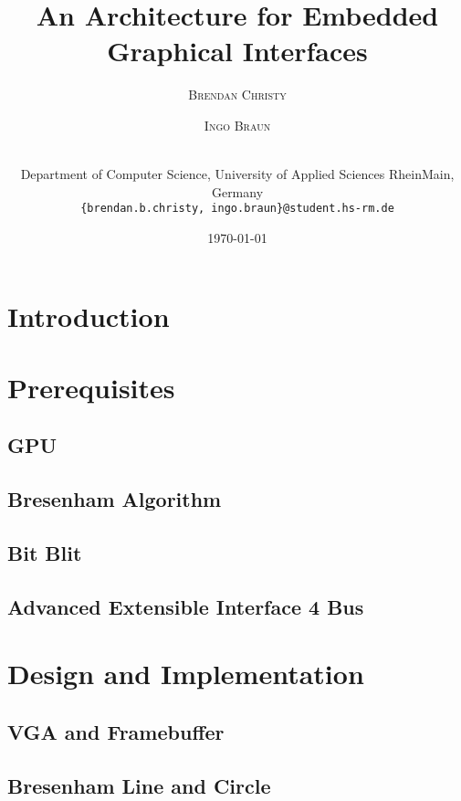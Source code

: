 \documentclass[a4paper]{article}
\title{An Architecture for Embedded Graphical Interfaces} %
\author{%
	\textsc{Brendan Christy} \and \textsc{Ingo Braun} \and\\[-2ex]
	\vspace{1pt} \footnotesize Department of Computer Science, University of Applied Sciences RheinMain, Germany \\ 
	\vspace{1pt} \footnotesize \texttt{\{brendan.b.christy, ingo.braun\}@student.hs-rm.de}
}
\date{\today} %
\begin{document}
	
	
	
	\maketitle
	
	\section{Introduction}
	
	
	\section{Prerequisites}
	
	\subsection{GPU}
	
	
	\subsection{Bresenham Algorithm}
	
	
	\subsection{Bit Blit}
	
	
	\subsection{Advanced Extensible Interface   4 Bus}
	
	
	\section{Design and Implementation}
	\subsection{VGA and Framebuffer}
	
	
	\subsection{Bresenham Line and Circle}\label{subsec:des_bresenham}
	
	
\end{document}
